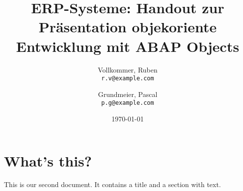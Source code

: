 \documentclass[12pt,a4paper]{scrartcl}
\begin{document}
\title{ERP-Systeme: Handout zur Präsentation objekoriente Entwicklung mit ABAP Objects}

\author{
  Vollkommer, Ruben\\
  \texttt{r.v@example.com}
  \and
  Grundmeier, Pascal\\
  \texttt{p.g@example.com}
}


\date{\today}
\maketitle
\section{What's this?}
This is our second document. It contains a title and a section
with text.
\end{document}

